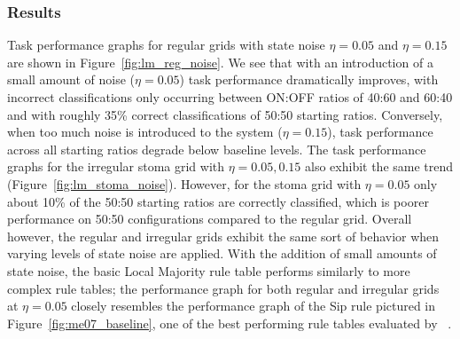 \documentclass[a4paper,11pt]{article}
\begin{document}
\subsubsection*{Results}

Task performance graphs for regular grids with state noise $\eta=0.05$ and $\eta=0.15$ are shown in Figure~\ref{fig:lm_reg_noise}. We see that with an introduction of a small amount of noise ($\eta=0.05$) task performance dramatically improves, with incorrect classifications only occurring between ON:OFF ratios of 40:60 and 60:40 and with roughly 35\% correct classifications of 50:50 starting ratios. Conversely, when too much noise is introduced to the system ($\eta=0.15$), task performance across all starting ratios degrade below baseline levels. The task performance graphs for the irregular stoma grid with $\eta=0.05, 0.15$ also exhibit the same trend (Figure~\ref{fig:lm_stoma_noise}). However, for the stoma grid with $\eta=0.05$ only about 10\% of the 50:50 starting ratios are correctly classified, which is poorer performance on 50:50 configurations compared to the regular grid. Overall however, the regular and irregular grids exhibit the same sort of behavior when varying levels of state noise are applied. With the addition of small amounts of state noise, the basic Local Majority rule table performs similarly to more complex rule tables; the performance graph for both regular and irregular grids at $\eta=0.05$ closely resembles the performance graph of the Sip rule pictured in Figure~\ref{fig:me07_baseline}, one of the best performing rule tables evaluated by \citeauthor{me07}~\cite{me07}.
\end{document}
